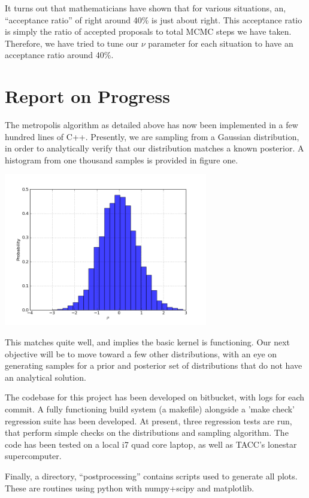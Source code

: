 \documentclass{article}
\begin{document}
It turns out that mathematicians have shown that for various situations,
an, ``acceptance ratio'' of right around 40\% is just about right. This
acceptance ratio is simply the ratio of accepted proposals to total MCMC
steps we have taken. Therefore, we have tried to tune our $\nu$
parameter for each situation to have an acceptance ratio around 40\%. 



\section{Report on Progress}

The metropolis algorithm as detailed above has now been implemented in a few hundred lines of C++. 
Presently, we are sampling from a Gaussian distribution, in order to analytically verify that 
our distribution matches a known posterior. A histogram from one thousand samples is provided in 
figure one. 
\begin{center}
 \includegraphics[width=3.5in]{figs/hist}
\end{center}

This matches quite well, and implies the basic kernel is functioning. Our next objective will be to 
move toward a few other distributions, with an eye on generating samples for a prior and posterior set of 
distributions that do not have an analytical solution. 

The codebase for this project has been developed on bitbucket, with logs
 for each commit. A fully functioning build system (a makefile) alongside a 'make  
 check' regression suite has been developed. At present, three
 regression tests are run, that perform simple checks on the
 distributions and sampling algorithm. The code has been tested on a local i7 quad core laptop, as well as TACC's
lonestar supercomputer. 

Finally, a directory, ``postprocessing'' contains scripts used to
generate all plots. These are routines using python with numpy+scipy and
matplotlib. 
\end{document}
